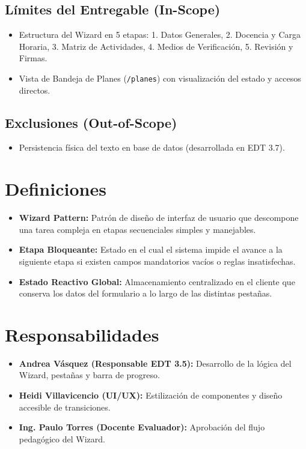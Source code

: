 \documentclass[12pt,a4paper]{article}
\begin{document}
\subsection{Límites del Entregable (In-Scope)}
\begin{itemize}[leftmargin=1.5em, itemsep=2pt]
    \item Estructura del Wizard en 5 etapas: 1. Datos Generales, 2. Docencia y Carga Horaria, 3. Matriz de Actividades, 4. Medios de Verificación, 5. Revisión y Firmas.
    \item Vista de Bandeja de Planes (\texttt{/\allowbreak  planes}) con visualización del estado y accesos directos.
\end{itemize}
\subsection{Exclusiones (Out-of-Scope)}
\begin{itemize}[leftmargin=1.5em, itemsep=2pt]
    \item Persistencia física del texto en base de datos (desarrollada en EDT 3.7).
\end{itemize}

\section{Definiciones}
\begin{itemize}[leftmargin=1.5em, itemsep=2pt]
    \item \textbf{Wizard Pattern:} Patrón de diseño de interfaz de usuario que descompone una tarea compleja en etapas secuenciales simples y manejables.
    \item \textbf{Etapa Bloqueante:} Estado en el cual el sistema impide el avance a la siguiente etapa si existen campos mandatorios vacíos o reglas insatisfechas.
    \item \textbf{Estado Reactivo Global:} Almacenamiento centralizado en el cliente que conserva los datos del formulario a lo largo de las distintas pestañas.
\end{itemize}

\section{Responsabilidades}
\begin{itemize}[leftmargin=1.5em, itemsep=2pt]
    \item \textbf{Andrea Vásquez (Responsable EDT 3.5):} Desarrollo de la lógica del Wizard, pestañas y barra de progreso.
    \item \textbf{Heidi Villavicencio (UI/UX):} Estilización de componentes y diseño accesible de transiciones.
    \item \textbf{Ing. Paulo Torres (Docente Evaluador):} Aprobación del flujo pedagógico del Wizard.
\end{itemize}
\end{document}

